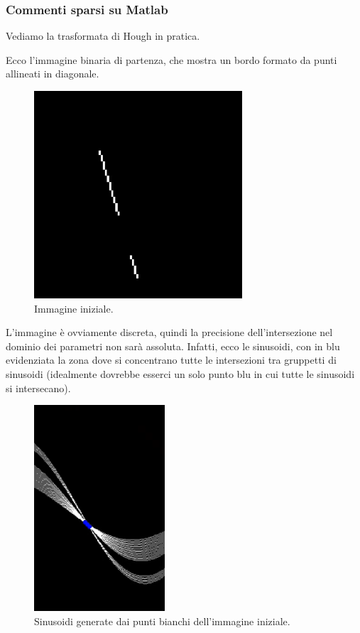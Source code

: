 \documentclass[a4paper,11pt]{article}
\begin{document}
\subsubsection{Commenti sparsi su Matlab}
Vediamo la trasformata di Hough in pratica.
\par
Ecco l'immagine binaria di partenza, che mostra un bordo formato da punti allineati in diagonale. 

\newpage
\renewcommand{\thefigure}{10.5}
\begin{figure}[!h]
  \centering
    \includegraphics[scale=0.5]{images/10/starting_image_one_line.png}
    \caption{Immagine iniziale.}
\end{figure}

L'immagine è ovviamente discreta, quindi la precisione dell'intersezione nel dominio dei parametri non sarà assoluta. Infatti, ecco le sinusoidi,
con in blu evidenziata la zona dove si concentrano tutte le intersezioni tra gruppetti di sinusoidi (idealmente dovrebbe esserci un
solo punto blu in cui tutte le sinusoidi si intersecano).

\renewcommand{\thefigure}{10.6}
\begin{figure}[!h]
  \centering
    \includegraphics[scale=0.5]{images/10/generated_sinusoids_one_line.png}
    \caption{Sinusoidi generate dai punti bianchi dell'immagine iniziale.}
\end{figure}
\end{document}

